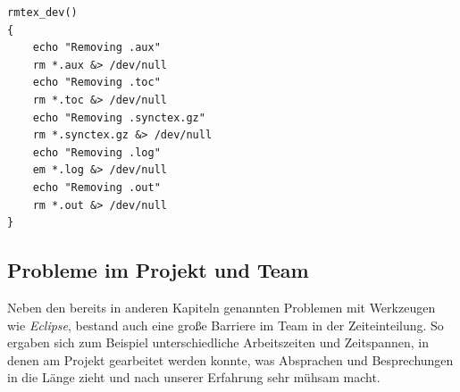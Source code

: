\begin{lstlisting}[frame=single]
rmtex_dev()
{
	echo "Removing .aux"
	rm *.aux &> /dev/null
	echo "Removing .toc"
	rm *.toc &> /dev/null
	echo "Removing .synctex.gz"
	rm *.synctex.gz &> /dev/null
	echo "Removing .log"
	em *.log &> /dev/null
	echo "Removing .out"
	rm *.out &> /dev/null
}
\end{lstlisting}

\subsection{Probleme im Projekt und Team}
Neben den bereits in anderen Kapiteln genannten Problemen mit Werkzeugen wie \textit{Eclipse}, bestand auch eine große Barriere im Team in der Zeiteinteilung. So ergaben sich zum Beispiel unterschiedliche Arbeitszeiten und Zeitspannen, in denen am Projekt gearbeitet werden konnte, was Absprachen und Besprechungen in die Länge zieht und nach unserer Erfahrung sehr mühsam macht.
